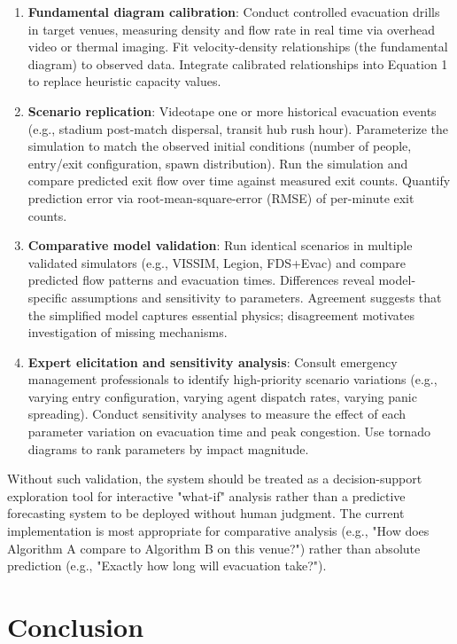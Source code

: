 \documentclass[conference]{IEEEtran}
\begin{document}
\begin{enumerate}
\item \textbf{Fundamental diagram calibration}: Conduct controlled evacuation drills in target venues, measuring density and flow rate in real time via overhead video or thermal imaging. Fit velocity-density relationships (the fundamental diagram) to observed data. Integrate calibrated relationships into Equation 1 to replace heuristic capacity values.

\item \textbf{Scenario replication}: Videotape one or more historical evacuation events (e.g., stadium post-match dispersal, transit hub rush hour). Parameterize the simulation to match the observed initial conditions (number of people, entry/exit configuration, spawn distribution). Run the simulation and compare predicted exit flow over time against measured exit counts. Quantify prediction error via root-mean-square-error (RMSE) of per-minute exit counts.

\item \textbf{Comparative model validation}: Run identical scenarios in multiple validated simulators (e.g., VISSIM, Legion, FDS+Evac) and compare predicted flow patterns and evacuation times. Differences reveal model-specific assumptions and sensitivity to parameters. Agreement suggests that the simplified model captures essential physics; disagreement motivates investigation of missing mechanisms.

\item \textbf{Expert elicitation and sensitivity analysis}: Consult emergency management professionals to identify high-priority scenario variations (e.g., varying entry configuration, varying agent dispatch rates, varying panic spreading). Conduct sensitivity analyses to measure the effect of each parameter variation on evacuation time and peak congestion. Use tornado diagrams to rank parameters by impact magnitude.
\end{enumerate}

Without such validation, the system should be treated as a decision-support exploration tool for interactive "what-if" analysis rather than a predictive forecasting system to be deployed without human judgment. The current implementation is most appropriate for comparative analysis (e.g., "How does Algorithm A compare to Algorithm B on this venue?") rather than absolute prediction (e.g., "Exactly how long will evacuation take?").

\section{Conclusion}
\end{document}
